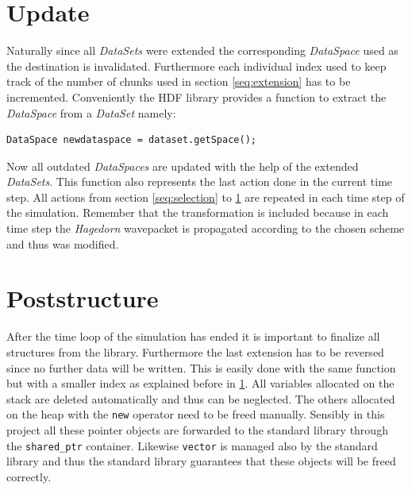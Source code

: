 \section{Update}
\label{seq:update}
Naturally since all \textit{DataSets} were extended the corresponding \textit{DataSpace} used as the destination is invalidated. Furthermore each individual index used to keep track of the number of chunks used in section \ref{seq:extension} has to be incremented. Conveniently the HDF library provides a function to extract the \textit{DataSpace} from a \textit{DataSet} namely:
\begin{lstlisting}
DataSpace newdataspace = dataset.getSpace();
\end{lstlisting}
Now all outdated \textit{DataSpaces} are updated with the help of the extended \textit{DataSets}. This function also represents the last action done in the current time step. All actions from section \ref{seq:selection} to \ref{seq:update} are repeated in each time step of the simulation. Remember that the transformation is included because in each time step the \textit{Hagedorn} wavepacket is propagated according to the chosen scheme and thus was modified.

\section{Poststructure}
\label{seq:poststructure}
After the time loop of the simulation has ended it is important to finalize all structures from the library. Furthermore the last extension has to be reversed since no further data will be written. This is easily done with the same function but with a smaller index as explained before in \ref{seq:update}. All variables allocated on the stack are deleted automatically and thus can be neglected. The others allocated on the heap with the \texttt{new} operator need to be freed manually. Sensibly in this project all these pointer objects are forwarded to the standard library through the \texttt{shared\_ptr} container. Likewise \texttt{vector} is managed also by the standard library and thus the standard library guarantees that these objects will be freed correctly.

